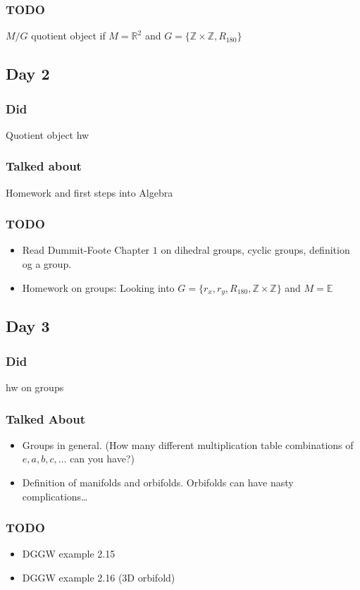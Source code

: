\documentclass[11pt]{article}
\begin{document}
\subsubsection{TODO}
$M/G$ quotient object if $M = \mathbb{R}^2$ and $G = \{\mathbb{Z}\times\mathbb{Z}, R_{180}\}$
\subsection{Day 2}
\subsubsection{Did}
Quotient object hw
\subsubsection{Talked about}
Homework and first steps into Algebra
\subsubsection{TODO}
\begin{itemize}
    \item Read Dummit-Foote Chapter $1$ on dihedral groups, cyclic groups, definition og a group.
    \item Homework on groups: Looking into $G =\{r_x,r_y,R_{180},\mathbb{Z}\times \mathbb{Z}\}$ and $M = \mathbb{E}$
\end{itemize}
\subsection{Day 3}
\subsubsection{Did}
    hw on groups
\subsubsection{Talked About}
\begin{itemize}
    \item Groups in general. (How many different multiplication table combinations of $e,a,b,c,\dots$ can you have?)
    \item Definition of manifolds and orbifolds. Orbifolds can have nasty complications\dots
\end{itemize}
\subsubsection{TODO}
\begin{itemize}
    \item DGGW example 2.15 
    \item DGGW example 2.16 (3D orbifold)
\end{itemize}
\end{document}

